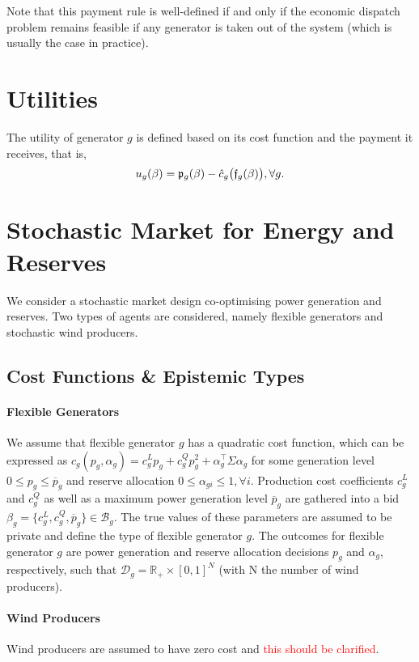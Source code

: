 \documentclass{article}
\begin{document}
Note that this payment rule is well-defined if and only if the economic dispatch problem remains feasible if any generator is taken out of the system (which is usually the case in practice).

\section{Utilities}

The utility of generator $g$ is defined based on its cost function and the payment it receives, that is,
\begin{equation}
u_g(\beta) = \mathfrak{p}_g(\beta) - \hat{c}_g\big(\frak{f}_g(\beta)\big), \forall g.
\end{equation}

\section{Stochastic Market for Energy and Reserves}

We consider a stochastic market design co-optimising power generation and reserves. Two types of agents are considered, namely flexible generators and stochastic wind producers.

\subsection{Cost Functions \& Epistemic Types}

\paragraph{Flexible Generators} We assume that flexible generator $g$ has a quadratic cost function, which can be expressed as $c_g(p_g, \alpha_g) = c_g^L p_g + c_g^Q p_g^2 + \alpha_g^\top \Sigma \alpha_g$ for some generation level $0 \le p_g \le \overline{p}_g$ and reserve allocation $0 \le \alpha_{gi} \le 1, \forall i$. Production cost coefficients $c_g^L$ and $c_g^Q$ as well as a maximum power generation level $\overline{p}_g$ are gathered into a bid $\beta_g = \{c_g^L, c_g^Q, \overline{p}_g\} \in \mathcal{B}_g$. The true values of these parameters are assumed to be private and define the type of flexible generator $g$.  The outcomes for flexible generator $g$ are power generation and reserve allocation decisions $p_g$ and $\alpha_g$, respectively, such that $\mathcal{D}_g = \mathbb{R}_+ \times [0, 1]^N$ (with N the number of wind producers).

\paragraph{Wind Producers} Wind producers are assumed to have zero cost and \textcolor{red}{this should be clarified}.
\end{document}

